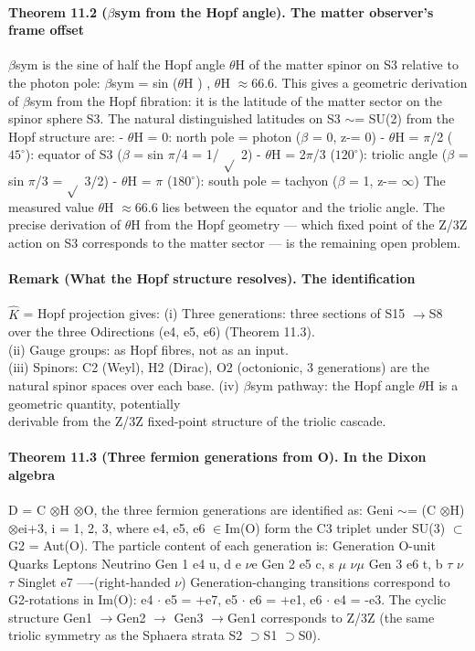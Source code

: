 \paragraph*{Theorem 11.2 ($\beta$sym from the Hopf angle). The matter observer's frame offset}
$\beta$sym is the sine of half the Hopf angle $\theta$H of the matter spinor on S3 relative to the photon pole: $\beta$sym = sin ($\theta$H ) , $\theta$H $\approx$66.6. This gives a geometric derivation of $\beta$sym from the Hopf fibration: it is the latitude of the matter sector on the spinor sphere S3. The natural distinguished latitudes on S3 $\sim$= SU(2) from the Hopf structure are:
- $\theta$H = 0: north pole = photon ($\beta$ = 0, z-= 0)
- $\theta$H = $\pi$/2 ($45^\circ$): equator of S3 ($\beta$ = sin $\pi$/4 = 1/
$\sqrt{}$ 2)
- $\theta$H = 2$\pi$/3 ($120^\circ$): triolic angle ($\beta$ = sin $\pi$/3 =
$\sqrt{}$ 3/2)
- $\theta$H = $\pi$ ($180^\circ$): south pole = tachyon ($\beta$ = 1, z-= $\infty$)
The measured value $\theta$H $\approx$66.6 lies between the equator and the triolic angle. The precise derivation of $\theta$H from the Hopf geometry --- which fixed point of the Z/3Z action on S3 corresponds to the matter sector --- is the remaining open problem.
\paragraph*{Remark (What the Hopf structure resolves). The identification}
$\hat K$ = Hopf projection gives:
(i) Three generations: three sections of S15 $\to$S8 over the three Odirections (e4, e5, e6) (Theorem 11.3).\\
(ii) Gauge groups: as Hopf fibres, not as an input.\\
(iii) Spinors: C2 (Weyl), H2 (Dirac), O2 (octonionic, 3 generations) are the\\
natural spinor spaces over each base.
(iv) $\beta$sym pathway: the Hopf angle $\theta$H is a geometric quantity, potentially\\
derivable from the Z/3Z fixed-point structure of the triolic cascade.
\paragraph*{Theorem 11.3 (Three fermion generations from O). In the Dixon algebra}
D = C $\otimes$H $\otimes$O, the three fermion generations are identified as: Geni $\sim$= (C $\otimes$H) $\otimes$ei+3, i = 1, 2, 3, where e4, e5, e6 $\in$Im(O) form the C3 triplet under SU(3) $\subset$G2 = Aut(O). The particle content of each generation is:
Generation O-unit Quarks Leptons Neutrino Gen 1 e4 u, d e $\nu$e Gen 2 e5 c, s $\mu$ $\nu$$\mu$ Gen 3 e6 t, b $\tau$ $\nu$$\tau$ Singlet e7 ----(right-handed $\nu$) Generation-changing transitions correspond to G2-rotations in Im(O): e4 $\cdot$ e5 = +e7, e5 $\cdot$ e6 = +e1, e6 $\cdot$ e4 = -e3. The cyclic structure Gen1 $\to$Gen2 $\to$ Gen3 $\to$Gen1 corresponds to Z/3Z (the same triolic symmetry as the Sphaera strata S2 $\supset$S1 $\supset$S0).
